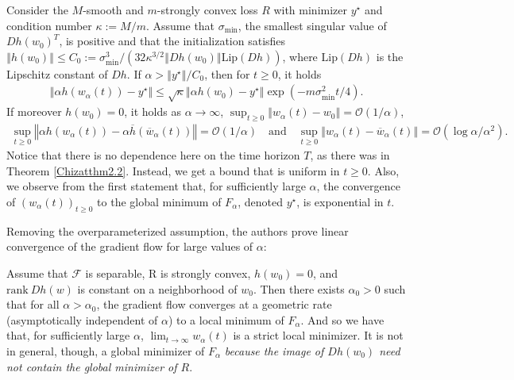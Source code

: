 \documentclass{article}
\newenvironment{manualtheorem}[1]{%
  \renewcommand\themanualtheoreminner{#1}%
  \manualtheoreminner
}{\endmanualtheoreminner}
\begin{document}
\begin{manualtheorem}{2.4}
Consider the $M$-smooth and $m$-strongly convex loss $R$ with minimizer $y^{\star}$ and condition number $\kappa := M/m$. Assume that $\sigma_{\text{min}}$, the smallest singular value of $Dh(w_0)^T$, is positive and that the initialization satisfies $\left\Vert h(w_0) \right\Vert \leq C_0:= \sigma_{\text{min}}^3/(32\kappa^{3/2} \left\Vert Dh(w_0) \right\Vert \text{Lip}(Dh))$, where $\text{Lip}(Dh)$ is the Lipschitz constant of $Dh$. If $\alpha > \left\Vert y^{\star} \right\Vert / C_0$, then for $t \geq 0$, it holds
\begin{align*}
    \left\Vert \alpha h(w_{\alpha}(t)) - y^{\star} \right\Vert \leq \sqrt{\kappa} \left\Vert \alpha h(w_0) - y^{\star} \right\Vert \exp( -m \sigma_{\text{min}}^2 t/4).
\end{align*}
If moreover $h(w_0) = 0$, it holds as $\alpha \rightarrow \infty$, $\sup_{t \geq 0} \left\Vert w_{\alpha}(t) - w_0 \right\Vert = \mathcal{O}(1/\alpha)$,
\begin{align*}
    \sup_{t \geq 0} \left\Vert \alpha h(w_{\alpha}(t)) - \alpha \overline{h}(\overline{w}_{\alpha}(t)) \right\Vert = \mathcal{O}(1/\alpha) \quad \text{and} \quad  \sup_{t \geq 0} \left\Vert w_{\alpha}(t) - \overline{w}_{\alpha}(t) \right\Vert = \mathcal{O}(\log \alpha/\alpha^2).
\end{align*}
\end{manualtheorem}
Notice that there is no dependence here on the time horizon $T$, as there was in Theorem \ref{Chizatthm2.2}. Instead, we get a bound that is uniform in $t \geq 0$. Also, we observe from the first statement that, for sufficiently large $\alpha$, the convergence of $(w_{\alpha}(t))_{t \geq 0}$ to the global minimum of $F_{\alpha}$, denoted $y^{\star}$, is exponential in $t$.

Removing the overparameterized assumption, the authors prove linear convergence of the gradient flow for large values of $\alpha$:
\begin{manualtheorem}{2.5}
Assume that $\mathcal{F}$ is separable, R is strongly convex, $h(w_0) = 0$, and $\text{rank} \ Dh(w)$ is constant on a neighborhood of $w_0$. Then there exists ${\alpha_0} > 0$ such that for all $\alpha > \alpha_0$, the gradient flow converges at a geometric rate (asymptotically independent of $\alpha$) to a local minimum of $F_{\alpha}$.
\end{manualtheorem}
And so we have that, for sufficiently large $\alpha$, $\lim_{t \rightarrow \infty} w_{\alpha}(t)$ is a strict local minimizer. It is not in general, though, a global minimizer of $F_{\alpha}$ \textit{because the image of $Dh(w_0)$ need not contain the global minimizer of $R$}.
\end{document}

